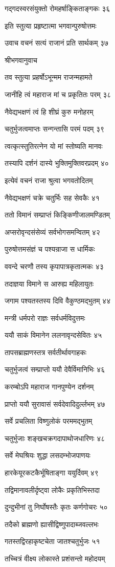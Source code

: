 गद्गदस्वरसंयुक्तो रोमहर्षाङ्किताङ्गकः ३६

इति स्तुत्या प्रहृष्टात्मा भगवान्पुरुषोत्तमः

उवाच वचनं सत्यं राजानं प्रति सार्थकम् ३७

श्रीभगवानुवाच

तव स्तुत्या प्रहर्षोऽभून्मम राजन्महामते

जानीहि त्वं महाराज मां च प्रकृतितः परम् ३८

नैवेद्यभक्षणं त्वं हि शीघ्रं कुरु मनोहरम्

चतुर्भुजत्वमाप्तः सन्गन्तासि परमं पदम् ३९

त्वत्कृत्स्तुतिरत्नेन यो मां स्तोष्यति मानवः

तस्यापि दर्शनं दास्ये भुक्तिमुक्तिवरप्रदम् ४०

इत्येवं वचनं राजा श्रुत्वा भगवतोदितम्

नैवेद्यभक्षणं चक्रे चतुर्भिः सह सेवकैः ४१

ततो विमानं सम्प्राप्तं किङ्किणीजालमण्डितम्

अप्सरोवृन्दसंसेव्यं सर्वभोगसमन्वितम् ४२

पुरुषोत्तमसंज्ञं च पश्यन्राजा स धार्मिकः

ववन्दे चरणौ तस्य कृपापात्रकृतात्मकः ४३

तदाज्ञया विमाने स आरुह्य महिलायुतः

जगाम पश्यतस्तस्य दिवि वैकुण्ठमद्भुतम् ४४

मन्त्री धर्मपरो राज्ञः सर्वधर्मविदुत्तमः

ययौ साकं विमानेन ललनावृन्दसेवितः ४५

तापसब्राह्मणस्तत्र सर्वतीर्थावगाहकः

चतुर्भुजत्वं सम्प्राप्तो ययौ देवैर्विमानिभिः ४६

करम्बोऽपि महाराज गानपुण्येन दर्शनम्

प्राप्तो ययौ सुरावासं सर्वदेवादिदुर्ल्लभम् ४७

सर्वे प्रचलिता विष्णुलोकं परममद्भुतम्

चतुर्भुजाः शङ्खचक्रगदापाथोजधारिणः ४८

सर्वे मेघश्रियः शुद्धा लसदम्भोजपाणयः

हारकेयूरकटकैर्भूषिताङ्गा ययुर्दिवम् ४९

तद्विमानावलीर्दृष्ट्वा लोकैः प्रकृतिभिस्तदा

दुन्दुभीनां तु निर्घोषस्तैः कृतः कर्णगोचरः ५०

तदैको ब्राह्मणो ह्यासीद्विष्णुपादाब्जवल्लभः

गतस्तद्विरहाकृष्टचेता जातश्चतुर्भुजः ५१

तच्चित्रं वीक्ष्य लोकास्ते प्रशंसन्तो महोदयम्

